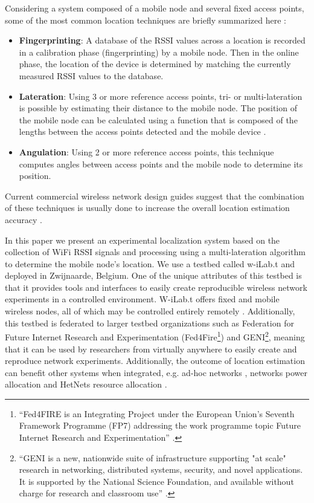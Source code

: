 \documentclass[journal]{IEEEtran} 				\IEEEoverridecommandlockouts 						\usepackage{amsmath,amssymb}
\begin{document}
Considering a system composed of a mobile node and several fixed access points, some of the most common location techniques are briefly summarized here \cite{Brown2011}:
\begin{itemize}
	\item \textbf{Fingerprinting}: A database of the RSSI values across a location is recorded in a calibration phase (fingerprinting) by a mobile node. Then in the online phase, the location of the device is determined by matching the currently measured RSSI values to the database.
	\item \textbf{Lateration}: Using 3 or more reference access points, tri- or multi-lateration is possible by estimating their distance to the mobile node. The position of the mobile node can be calculated using a function that is composed of the lengths between the access points detected and the mobile device \cite{Brown2011}.
	\item \textbf{Angulation}: Using 2 or more reference access points, this technique computes angles between access points and the mobile node to determine its position.
\end{itemize}

Current commercial wireless network design guides suggest that the combination of these techniques is usually done to increase the overall location estimation accuracy \cite{cisco_wifi_lbs}.

In this paper we present an experimental localization system based on the collection of WiFi RSSI signals and processing using a multi-lateration algorithm to determine the mobile node's location. We use a testbed called w-iLab.t and deployed in Zwijnaarde, Belgium. One of the unique attributes of this testbed is that it provides tools and interfaces to easily create reproducible wireless network experiments in a controlled environment. W-iLab.t offers fixed and mobile wireless nodes, all of which may be controlled entirely remotely \cite{becue2012}. Additionally, this testbed is federated to larger testbed organizations such as Federation for Future Internet Research and Experimentation (Fed4Fire\footnote{``Fed4FIRE is an Integrating Project under the European Union’s Seventh Framework Programme (FP7) addressing the work programme topic Future Internet Research and Experimentation'' \cite{fed4fire}.}) and GENI\footnote{``GENI is a new, nationwide suite of infrastructure supporting "at scale" research in 
networking, distributed systems, security, and novel applications. It is supported by the National Science Foundation, and available without charge for research and classroom use'' \cite{geni}.}, meaning that it can be used by researchers from virtually anywhere to easily create and reproduce network experiments. Additionally, the outcome of location estimation can benefit other systems when integrated, e.g. ad-hoc networks \cite{Jose_INFOCOM2010, Abdelhadi_ITW2010}, networks power allocation \cite{AbdelhadiarXiv2014_1, WangarXiv2015_1, WangarXiv2015_2} and HetNets resource allocation \cite{Shajaiaharxiv2015_1, AbdelhadiICNC2015}.
\end{document}
